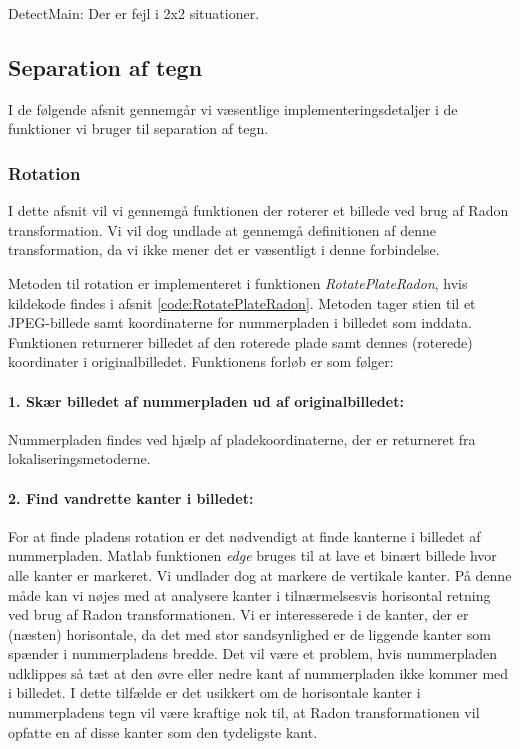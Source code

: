 DetectMain: Der er fejl i 2x2 situationer.



\subsection{Separation af tegn}

I de følgende afsnit gennemgår vi væsentlige implementeringsdetaljer i de funktioner vi bruger til separation af tegn.

\subsubsection{Rotation}
\label{sec:implementation/sep/rotation}

I dette afsnit vil vi gennemgå funktionen der roterer et billede ved brug af Radon transformation. Vi vil dog undlade at gennemgå definitionen af denne transformation, da vi ikke mener det er væsentligt i denne forbindelse.

Metoden til rotation er implementeret i funktionen \textit{RotatePlateRadon}, hvis kildekode findes i afsnit \vref{code:RotatePlateRadon}. Metoden tager stien til et JPEG-billede samt koordinaterne for nummerpladen i billedet som inddata. Funktionen returnerer billedet af den roterede plade samt dennes (roterede) koordinater i originalbilledet. Funktionens forløb er som følger:

\paragraph{1. Skær billedet af nummerpladen ud af originalbilledet:}
Nummerpladen findes ved hjælp af pladekoordinaterne, der er returneret fra lokaliseringsmetoderne.

\paragraph{2. Find vandrette kanter i billedet:}
For at finde pladens rotation er det nødvendigt at finde kanterne i billedet af nummerpladen. Matlab funktionen \textit{edge} bruges til at lave et binært billede hvor alle kanter er markeret. Vi undlader dog at markere de vertikale kanter. På denne måde kan vi nøjes med at analysere kanter i tilnærmelsesvis horisontal retning ved brug af Radon transformationen. Vi er interesserede i de kanter, der er (næsten) horisontale, da det med stor sandsynlighed er de liggende kanter som spænder i nummerpladens bredde. Det vil være et problem, hvis nummerpladen udklippes så tæt at den øvre eller nedre kant af nummerpladen ikke kommer med i billedet. I dette tilfælde er det usikkert om de horisontale kanter i nummerpladens tegn vil være kraftige nok til, at Radon transformationen vil opfatte en af disse kanter som den tydeligste kant.

